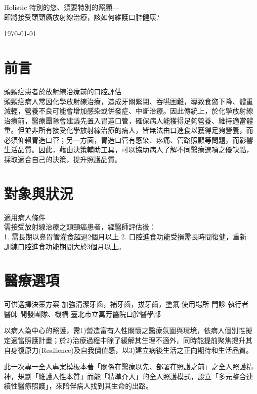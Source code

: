 \documentclass[12pt, a4paper]{article}
\begin{document}


{\LARGE
Holistic 特別的您、須要特別的照顧---\\

即將接受頭頸癌放射線治療，該如何維護口腔健康?}



\today\\


\section{前言}
頭頸癌患者於放射線治療前的口腔評估\\
頭頸癌病人常因化學放射線治療，造成牙關緊閉、吞嚥困難，導致食慾下降、體重減輕，營養不良可能會增加感染或併發症、中斷治療。因此傳統上，於化學放射線治療前，醫療團隊會建議先置入胃造口管，確保病人能獲得足夠營養、維持適當體重。但並非所有接受化學放射線治療的病人，皆無法由口進食以獲得足夠營養，而必須仰賴胃造口管；另一方面，胃造口管有感染、疼痛、管路照顧等問題，而影響生活品質。因此，藉由決策輔助工具，可以協助病人了解不同醫療選項之優缺點，採取適合自己的決策，提升照護品質。
\section{對象與狀況}
適用病人條件\\	需接受放射線治療之頭頸癌患者，經醫師評估後：\\
1. 需長期以鼻胃管灌食超過2個月以上 
2. 口腔進食功能受損需長時間復健，重新訓練口腔進食功能期間大於3個月以上。

\section{醫療選項}
可供選擇決策方案	加強清潔牙齒，補牙齒，拔牙齒，塗氟
使用場所 門診
執行者	醫師
開發團隊、機構	臺北市立萬芳醫院口腔醫學部

    以病人為中心的照護，需1)營造富有人性關懷之醫療氛圍與環境，依病人個別性擬定適當照護計畫；於2)治療過程中除了緩解其生理不適外，同時能提前聚焦提升其自身復原力(Resilience)及自我價值感，以3)建立病後生活之正向期待和生活品質。


    此一次專一全人專案模板本著「關係在醫療以先、部署在照護之前」之全人照護精神，規劃「維護人性本質」而能「精準介入」的全人照護模式，設立「多元整合連續性醫療照護」，來陪伴病人找到其生命的出路。\\[0.5cm]
  \husband[
      name=案夫, age=75y, status= not married, %
      extra node feature={blue, fill=blue!0},
      extra label feature={text=blue}]
  
\end{document}
